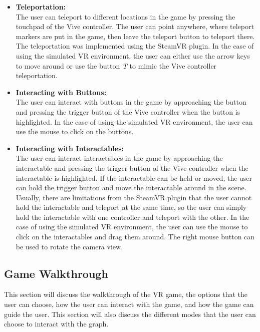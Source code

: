 \begin{itemize}
    \item \textbf{Teleportation:} \\
          The user can teleport to different locations in the game by pressing the touchpad of the Vive controller. The user can point anywhere, where teleport markers are put in the game, then leave the teleport button to teleport there. The teleportation was implemented using the SteamVR plugin. In the case of using the simulated \ac{VR} environment, the user can either use the arrow keys to move around or use the button \textit{T} to mimic the Vive controller teleportation.

    \item \textbf{Interacting with Buttons:} \\
          The user can interact with buttons in the game by approaching the button and pressing the trigger button of the Vive controller when the button is highlighted. In the case of using the simulated \ac{VR} environment, the user can use the mouse to click on the buttons.

    \item \textbf{Interacting with Interactables:} \\
          The user can interact interactables in the game by approaching the interactable and pressing the trigger button of the Vive controller when the interactable is highlighted. If the interactable can be held or moved, the user can hold the trigger button and move the interactable around in the scene. Usually, there are limitations from the SteamVR plugin that the user cannot hold the interactable and teleport at the same time, so the user can simply hold the interactable with one controller and teleport with the other. In the case of using the simulated \ac{VR} environment, the user can use the mouse to click on the interactables and drag them around. The right mouse button can be used to rotate the camera view.
\end{itemize}

\subsection{Game Walkthrough} \label{subsec:game_walkthrough}
This section will discuss the walkthrough of the \ac{VR} game, the options that the user can choose, how the user can interact with the game, and how the game can guide the user. This section will also discuss the different modes that the user can choose to interact with the graph.

